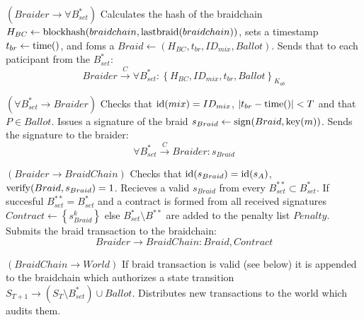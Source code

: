 \documentclass[12pt]{article}
\begin{document}
\begin{steps}
\item $(Braider \to \forall B^*_{set})$ Calculates the hash of the braidchain \\ $H_{BC} \leftarrow
  {\rm blockhash}(braidchain, {\rm lastbraid}(braidchain))$, sets a timestamp $t_{br} \leftarrow {\rm time}()$, and foms a $Braid \leftarrow (H_{BC}, t_{br}, ID_{mix}, Ballot)$. Sends that to each paticipant from the $B^*_{set}$:
  \begin{equation}
    Braider \overset{C}{\to} \forall B^*_{set}: \left\{ H_{BC}, ID_{mix}, t_{br}, Ballot \right\}_{K_{ab}}
  \end{equation}
\item $(\forall B^*_{set} \to Braider)$ Checks that ${\rm id}(mix) = ID_{mix}$, $|t_{br} - {\rm time}()|<T$ and that $P \in Ballot$. Issues a signature of the braid $s_{Braid} \leftarrow {\rm sign}(Braid, {\rm key}(m))$. Sends the signature to the braider:
  \begin{equation}
    \forall B^*_{set} \overset{C}{\to} Braider : s_{Braid} %
  \end{equation}

\item $(Braider \to BraidChain)$ Checks that ${\rm id}(s_{Braid})={\rm id}(s_A)$, ${\rm verify}(Braid, s_{Braid})=1$. Recieves a valid $s_{Braid}$ from every $B^{**}_{set} \subset B^*_{set}$. If succesful $B^{**}_{set} = B^{*}_{set}$ and a contract is formed from all received signatures $Contract \leftarrow \left\{ s^k_{Braid} \right\}$ else $B^{*}_{set} \setminus B^{**}$ are added to the penalty list $Penalty$. Submits the braid transaction to the braidchain:
  \begin{equation}
    Braider \to BraidChain: Braid, Contract
  \end{equation}

\item $(BraidChain \to World)$ If braid transaction is valid (see below) it is appended to the braidchain which authorizes a state transition $S_{T+1} \to (S_T \setminus B^*_{set}) \cup Ballot$. Distributes new transactions to the world which audits them.  %
  
\end{steps}
\end{document}
